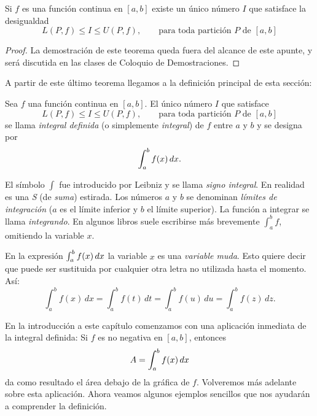 \begin{theorem}
  Si $f$ es una función continua en $[a,b]$ existe un único número $I$ que satisface la desigualdad 
  \[
  L(P,f)\le I\le U(P,f),
  \qquad\text{para toda partición $P$ de $[a,b]$}
  \]
\end{theorem}

\begin{proof}
  La demostración de este teorema queda fuera del alcance de este apunte, y será discutida en las clases de Coloquio de Demostraciones.
\end{proof}

A partir de este último teorema llegamos a la definición principal de esta sección:

\begin{definition}
  Sea $f$ una función continua en $[a,b]$. El único número $I$ que satisface 
  \[
    L(P,f)\le I\le U(P,f),
    \qquad\text{para toda partición $P$ de $[a,b]$}
  \]
  se llama \emph{integral definida} (o simplemente \emph{integral}) de $f$ entre $a$ y $b$ y se designa por
  \[
  \int_a^b f(x)\,dx.
  \]
\end{definition}

El símbolo $\int$ fue introducido por Leibniz y se llama \emph{signo integral}. En realidad es una \emph{S} (de \emph{suma}) estirada. Los números $a$ y $b$ se denominan \emph{límites de integración} ($a$ es el límite inferior y $b$ el límite superior). La función a integrar se llama \emph{integrando}. En algunos libros suele escribirse más brevemente $\int_a^b f$, omitiendo la variable $x$.

En la expresión $\int_a^b f(x)\,dx$ la variable $x$ es una \emph{variable muda}. Esto quiere decir que puede ser sustituida por cualquier otra letra no utilizada hasta el momento. Así:
\[
\int_a^b f(x)\, dx
= \int_a^b f(t)\, dt
= \int_a^b f(u)\, du
= \int_a^b f(z)\, dz.
\]

En la introducción a este capítulo comenzamos con una aplicación inmediata de la integral definida:
Si $f$ es no negativa en $[a,b]$, entonces
\[
A = \int_a^b f(x)\,dx
\]
da como resultado el área debajo de la gráfica de $f$.
Volveremos más adelante sobre esta aplicación.
Ahora veamos algunos ejemplos sencillos que nos ayudarán a comprender la definición.

